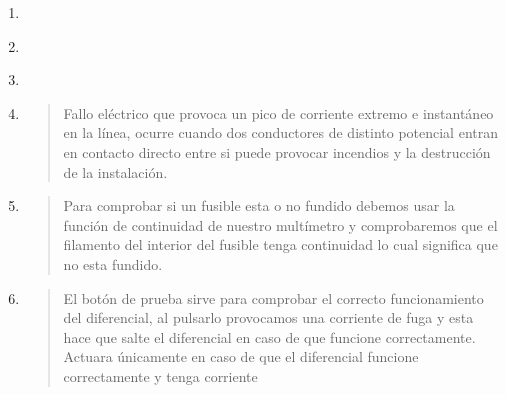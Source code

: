 \documentclass[spanish,openany]{report}
\begin{document}
\begin{enumerate}
  \item {}

  \begin{quote}
  \end{quote}

  \item {}

  \begin{quote}
  \end{quote}

  \item {}

  \begin{quote}
  \end{quote}

  \item {}

  \begin{quote}
	  Fallo eléctrico que provoca un pico de corriente extremo e instantáneo en la línea, ocurre cuando dos conductores de 
	  distinto potencial entran en contacto directo entre si puede provocar incendios y la destrucción de la instalación.
  \end{quote}

  \item {}

  \begin{quote}
	  Para comprobar si un fusible esta o no fundido debemos usar la función de continuidad de nuestro multímetro y comprobaremos que el filamento
	  del interior del fusible tenga continuidad lo cual significa que no esta fundido.
  \end{quote}

  \item {}

  \begin{quote}
	  El botón de prueba sirve para comprobar el correcto funcionamiento del diferencial, al pulsarlo provocamos una corriente de fuga y esta hace 
	  que salte el diferencial en caso de que funcione correctamente. Actuara únicamente en caso de que el diferencial funcione correctamente y 
	  tenga corriente
  \end{quote}


\end{enumerate}
\end{document}
